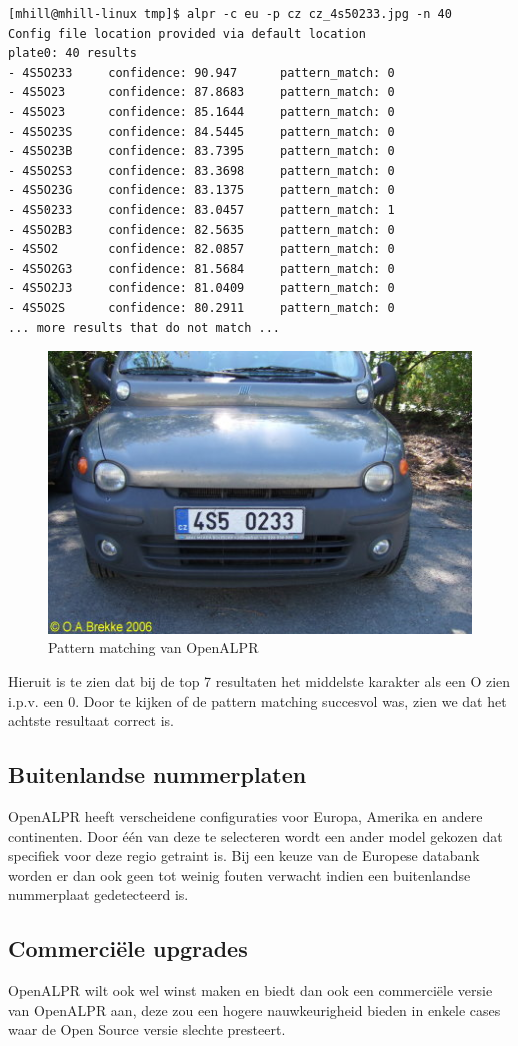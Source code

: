 \begin{lstlisting}
[mhill@mhill-linux tmp]$ alpr -c eu -p cz cz_4s50233.jpg -n 40
Config file location provided via default location
plate0: 40 results
- 4S5O233     confidence: 90.947      pattern_match: 0
- 4S5O23      confidence: 87.8683     pattern_match: 0
- 4S5O23      confidence: 85.1644     pattern_match: 0
- 4S5O23S     confidence: 84.5445     pattern_match: 0
- 4S5O23B     confidence: 83.7395     pattern_match: 0
- 4S5O2S3     confidence: 83.3698     pattern_match: 0
- 4S5O23G     confidence: 83.1375     pattern_match: 0
- 4S50233     confidence: 83.0457     pattern_match: 1
- 4S5O2B3     confidence: 82.5635     pattern_match: 0
- 4S5O2       confidence: 82.0857     pattern_match: 0
- 4S5O2G3     confidence: 81.5684     pattern_match: 0
- 4S5O2J3     confidence: 81.0409     pattern_match: 0
- 4S5O2S      confidence: 80.2911     pattern_match: 0
... more results that do not match ...
\end{lstlisting}

\begin{figure}[h!]
	\centering
	\includegraphics[width=\linewidth]{img/pattern-matching.jpg}
	\caption{Pattern matching van OpenALPR \autocite{openalpr2015pattern}}
	\label{patternmatching}
\end{figure}

Hieruit is te zien dat bij de top 7 resultaten het middelste karakter als een O zien i.p.v. een 0. Door te kijken of de pattern matching succesvol was, zien we dat het achtste resultaat correct is.

\subsection{Buitenlandse nummerplaten}
OpenALPR heeft verscheidene configuraties voor Europa, Amerika en andere continenten. Door één van deze te selecteren wordt een ander model gekozen dat specifiek voor deze regio getraint is. Bij een keuze van de Europese databank worden er dan ook geen tot weinig fouten verwacht indien een buitenlandse nummerplaat gedetecteerd is.

\subsection{Commerciële upgrades}
OpenALPR wilt ook wel winst maken en biedt dan ook een commerciële versie van OpenALPR aan, deze zou een hogere nauwkeurigheid bieden in enkele cases waar de Open Source versie slechte presteert. \autocite{openalpr2019benchmark}
